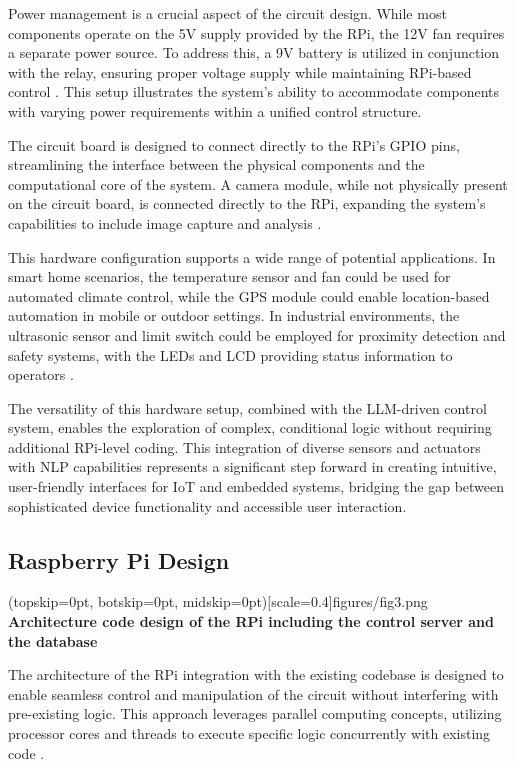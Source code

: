 \documentclass{ieeeaccess}
\begin{document}
Power management is a crucial aspect of the circuit design. While most components operate on the 5V supply provided by the RPi, the 12V fan requires a separate power source. To address this, a 9V battery is utilized in conjunction with the relay, ensuring proper voltage supply while maintaining RPi-based control \cite{monk2019}. This setup illustrates the system's ability to accommodate components with varying power requirements within a unified control structure.

The circuit board is designed to connect directly to the RPi's GPIO pins, streamlining the interface between the physical components and the computational core of the system. A camera module, while not physically present on the circuit board, is connected directly to the RPi, expanding the system's capabilities to include image capture and analysis \cite{pi_camera_2018}.

This hardware configuration supports a wide range of potential applications. In smart home scenarios, the temperature sensor and fan could be used for automated climate control, while the GPS module could enable location-based automation in mobile or outdoor settings. In industrial environments, the ultrasonic sensor and limit switch could be employed for proximity detection and safety systems, with the LEDs and LCD providing status information to operators \cite{mcmanus2021}.

The versatility of this hardware setup, combined with the LLM-driven control system, enables the exploration of complex, conditional logic without requiring additional RPi-level coding. This integration of diverse sensors and actuators with NLP capabilities represents a significant step forward in creating intuitive, user-friendly interfaces for IoT and embedded systems, bridging the gap between sophisticated device functionality and accessible user interaction.

\subsection{Raspberry Pi Design}

\Figure[t!](topskip=0pt, botskip=0pt,
midskip=0pt)[scale=0.4]{{figures/fig3.png}}
{ \centering \textbf{Architecture code design of the RPi including the control server and the database}\label{fig3}}

The architecture of the RPi integration with the existing codebase is designed to enable seamless control and manipulation of the circuit without interfering with pre-existing logic. This approach leverages parallel computing concepts, utilizing processor cores and threads to execute specific logic concurrently with existing code \cite{wilkinson2005parallel}.
\end{document}
